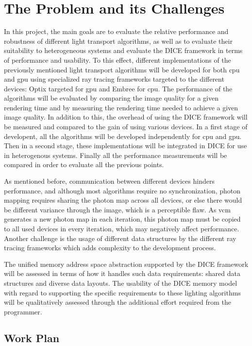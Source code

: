 \chapter{The Problem and its Challenges}

In this project, the main goals are to evaluate the relative performance and robustness of different light transport algorithms, as well as to evaluate their suitability to heterogeneous systems and evaluate the DICE framework in terms of performance and usability. To this effect, different implementations of the previously mentioned light transport algorithms will be developed for both \gls{cpu} and \gls{gpu} using specialized ray tracing frameworks targeted to the different devices: Optix targeted for \gls{gpu} and Embree for \gls{cpu}. The performance of the algorithms will be evaluated by comparing the image quality for a given rendering time and by measuring the rendering time needed to achieve a given image quality. In addition to this, the overhead of using the DICE framework will be measured and compared to the gain of using various devices. In a first stage of developent, all the algorithms will be developed independently for \gls{cpu} and \gls{gpu}. Then in a second stage, these implementations will be integrated in DICE for use in heterogenous systems. Finally all the performance measurements will be compared in order to evaluate all the previous points.

As mentioned before, communication between different devices hinders performance, and although most algorithms require no synchronization, photon mapping requires sharing the photon map across all devices, or else there would be different variance through the image, which is a perceptible flaw. As \gls{vcm} generates a new photon map in each iteration, this photon map must be copied to all used devices in every iteration, which may negatively affect performance. Another challenge is the usage of different data structures by the different ray tracing frameworks which adds complexity to the development process.

The unified memory address space abstraction supported by the DICE framework will be assessed in terms of how it handles such data requirements: shared data structures and diverse data layouts. The usability of the DICE memory model with regard to supporting the specific requirements to these lighting algorithms will be qualitatively assessed through the additional effort required from the programmer.

\section{Work Plan}

